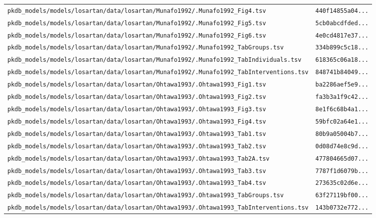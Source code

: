 \documentclass{article}
\begin{document}
\begin{longtable}{ll}
\texttt{pkdb\_models/models/losartan/data/losartan/Munafo1992/.Munafo1992\_Fig4.tsv} & \texttt{440f14855a04...} \\
\texttt{pkdb\_models/models/losartan/data/losartan/Munafo1992/.Munafo1992\_Fig5.tsv} & \texttt{5cb0abcdfded...} \\
\texttt{pkdb\_models/models/losartan/data/losartan/Munafo1992/.Munafo1992\_Fig6.tsv} & \texttt{4e0cd4817e37...} \\
\texttt{pkdb\_models/models/losartan/data/losartan/Munafo1992/.Munafo1992\_TabGroups.tsv} & \texttt{334b899c5c18...} \\
\texttt{pkdb\_models/models/losartan/data/losartan/Munafo1992/.Munafo1992\_TabIndividuals.tsv} & \texttt{618365c06a18...} \\
\texttt{pkdb\_models/models/losartan/data/losartan/Munafo1992/.Munafo1992\_TabInterventions.tsv} & \texttt{848741b84049...} \\
\texttt{pkdb\_models/models/losartan/data/losartan/Ohtawa1993/.Ohtawa1993\_Fig1.tsv} & \texttt{ba2286aef5e9...} \\
\texttt{pkdb\_models/models/losartan/data/losartan/Ohtawa1993/.Ohtawa1993\_Fig2.tsv} & \texttt{fa3b3a1f9c42...} \\
\texttt{pkdb\_models/models/losartan/data/losartan/Ohtawa1993/.Ohtawa1993\_Fig3.tsv} & \texttt{8e1f6c68b4a1...} \\
\texttt{pkdb\_models/models/losartan/data/losartan/Ohtawa1993/.Ohtawa1993\_Fig4.tsv} & \texttt{59bfc02a64e1...} \\
\texttt{pkdb\_models/models/losartan/data/losartan/Ohtawa1993/.Ohtawa1993\_Tab1.tsv} & \texttt{80b9a05004b7...} \\
\texttt{pkdb\_models/models/losartan/data/losartan/Ohtawa1993/.Ohtawa1993\_Tab2.tsv} & \texttt{0d08d74e8c9d...} \\
\texttt{pkdb\_models/models/losartan/data/losartan/Ohtawa1993/.Ohtawa1993\_Tab2A.tsv} & \texttt{477804665d07...} \\
\texttt{pkdb\_models/models/losartan/data/losartan/Ohtawa1993/.Ohtawa1993\_Tab3.tsv} & \texttt{7787f1d6079b...} \\
\texttt{pkdb\_models/models/losartan/data/losartan/Ohtawa1993/.Ohtawa1993\_Tab4.tsv} & \texttt{273635c02d6e...} \\
\texttt{pkdb\_models/models/losartan/data/losartan/Ohtawa1993/.Ohtawa1993\_TabGroups.tsv} & \texttt{63f27119bf00...} \\
\texttt{pkdb\_models/models/losartan/data/losartan/Ohtawa1993/.Ohtawa1993\_TabInterventions.tsv} & \texttt{143b0732e772...} \\

\end{longtable}
\end{document}
